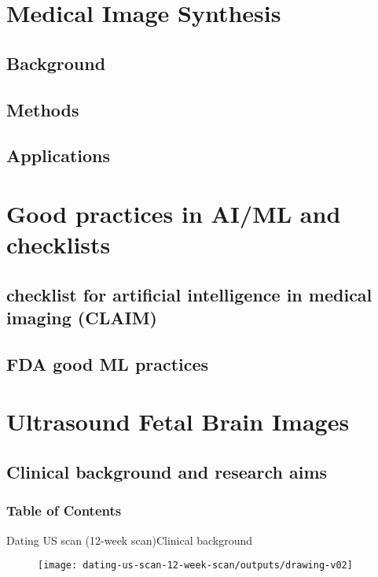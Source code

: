 
\section{Medical Image Synthesis}
\subsection{Background}
\subsection{Methods}
\subsection{Applications}

\section{Good practices in AI/ML and checklists}
\subsection{checklist for artificial intelligence in medical imaging (CLAIM)}
\subsection{FDA good ML practices}


\section{Ultrasound Fetal Brain Images}

\subsection{Clinical background and research aims}

\begin{frame}
  \frametitle{Table of Contents}
  \tableofcontents[currentsection]
\end{frame}



{

\begin{frame}{Dating US scan (12-week scan)}{Clinical background}
      \begin{figure}
        \centering
        \texttt{[image: dating-us-scan-12-week-scan/outputs/drawing-v02]}
      \end{figure}
\end{frame}
}



